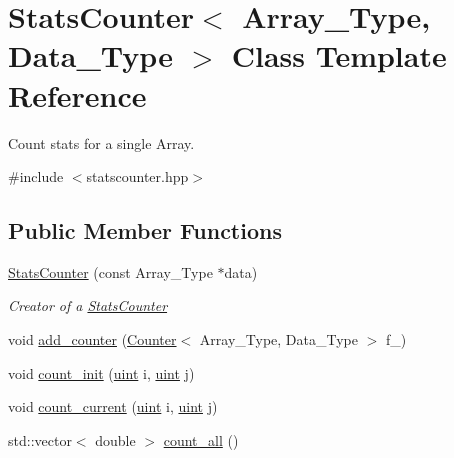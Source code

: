 \hypertarget{class_stats_counter}{}\section{Stats\+Counter$<$ Array\+\_\+\+Type, Data\+\_\+\+Type $>$ Class Template Reference}
\label{class_stats_counter}


Count stats for a single Array.  




{\ttfamily \#include $<$statscounter.\+hpp$>$}

\subsection*{Public Member Functions}
\begin{DoxyCompactItemize}
\item 
\hyperlink{class_stats_counter_a4479dd3e037f04c7ece27e136afe24ad}{Stats\+Counter} (const Array\+\_\+\+Type $\ast$data)
\begin{DoxyCompactList}\small\item\em Creator of a {\ttfamily \hyperlink{class_stats_counter}{Stats\+Counter}} \end{DoxyCompactList}\item 
void \hyperlink{class_stats_counter_ad175dcd2bd30d017881783de546ac333}{add\+\_\+counter} (\hyperlink{class_counter}{Counter}$<$ Array\+\_\+\+Type, Data\+\_\+\+Type $>$ f\+\_\+)
\item 
void \hyperlink{class_stats_counter_a19bd5936619e190c0d8918b4f343922e}{count\+\_\+init} (\hyperlink{typedefs_8hpp_a91ad9478d81a7aaf2593e8d9c3d06a14}{uint} i, \hyperlink{typedefs_8hpp_a91ad9478d81a7aaf2593e8d9c3d06a14}{uint} j)
\item 
void \hyperlink{class_stats_counter_ab81166f7cb67eeaecc469016d237019a}{count\+\_\+current} (\hyperlink{typedefs_8hpp_a91ad9478d81a7aaf2593e8d9c3d06a14}{uint} i, \hyperlink{typedefs_8hpp_a91ad9478d81a7aaf2593e8d9c3d06a14}{uint} j)
\item 
std\+::vector$<$ double $>$ \hyperlink{class_stats_counter_a83bd92031a1499109c98f238221cbd67}{count\+\_\+all} ()
\end{DoxyCompactItemize}
